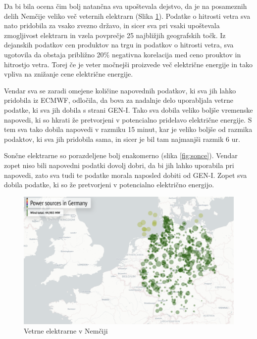 \documentclass[12pt,a4paper]{amsart}
\theoremstyle{definition} %
\theoremstyle{plain} %
\begin{document}
Da bi bila ocena čim bolj natančna sva upoštevala dejstvo, da je na posameznih delih Nemčije veliko več veternih elektrarn (Slika \ref{fig:veter}). 
Podatke o hitrosti vetra sva nato pridobila za vsako zvezno državo, in sicer sva pri vsaki upoštevala zmogljivost elektrarn in vzela povprečje 25 najbližjih geografskih točk.
Iz dejanskih podatkov cen produktov na trgu in podatkov o hitrosti vetra, sva ugotovila da obstaja približno 20\% negativna korelacija med ceno prouktov in hitrostjo vetra. Torej 
če je veter močnejši proizvede več električne energije in tako vpliva na znižanje cene električne energije. 

Vendar sva se zaradi omejene količine napovednih podatkov, ki sva jih lahko pridobila iz ECMWF, odločila, da bova za nadalnje delo uporabljala vetrne podatke, ki sva jih dobila s strani GEN-I. 
Tako sva dobila veliko boljše vremenske napovedi, ki so hkrati že pretvorjeni v potencialno pridelavo električne energije. S tem sva tako dobila napovedi v razmiku 15 minut, kar je veliko boljše od razmika podaktov, ki sva jih pridobila sama, in sicer je bil tam najmanjši razmik 6 ur.  


Sončne elektrarne so porazdeljene bolj enakomerno (slika \ref{fig:sonce}). Vendar zopet niso bili napovedni podatki dovolj dobri, da bi jih lahko uporabila pri napovedi, zato sva tudi te podatke morala naposled dobiti od GEN-I. Zopet sva dobila podatke, ki so že pretvorjeni v potencialno električno energijo.




\begin{figure}[h]
    \centering
    \includegraphics[scale=0.35]{wind_2016.png}
    \caption{Vetrne elektrarne v Nemčiji}
    \label{fig:veter}
\end{figure}
\end{document}
